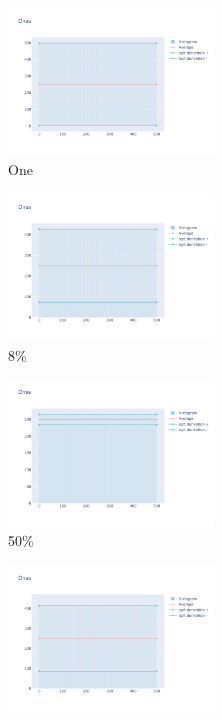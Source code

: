 \documentclass[12pt, fleqn]{report}                             %
\theoremstyle{break}                                            %
\begin{document}
      \begin{figure}[ht!]
        \centering
        \begin{subfigure}[b]{0.4\linewidth}
          \includegraphics[width=0.6\textwidth]{Images/11/dia-a.png}
          \caption{One}
        \end{subfigure}
        \begin{subfigure}[b]{0.4\linewidth}
          \includegraphics[width=0.6\textwidth]{Images/11/dia-b.png}
          \caption{8\%}
        \end{subfigure}
        \begin{subfigure}[b]{0.4\linewidth}
          \includegraphics[width=0.6\textwidth]{Images/11/dia-c.png}
          \caption{50\%}
        \end{subfigure}
        \begin{subfigure}[b]{0.4\linewidth}
          \includegraphics[width=0.6\textwidth]{Images/11/dia-d.png}

\end{subfigure}
\end{figure}
\end{document}
